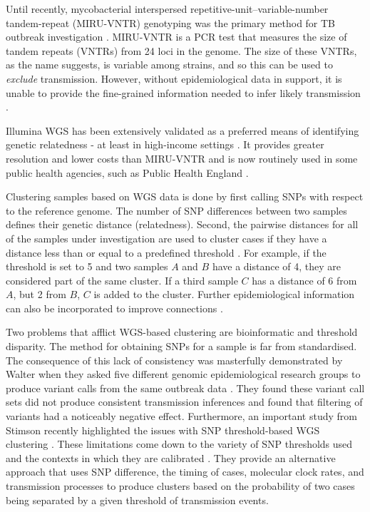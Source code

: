 Until recently, mycobacterial interspersed repetitive-unit–variable-number tandem-repeat (MIRU-VNTR) genotyping was the primary method for TB outbreak investigation \cite{walker2013}. MIRU-VNTR is a PCR test that measures the size of tandem repeats (VNTRs) from 24 loci in the \mtb{} genome. The size of these VNTRs, as the name suggests, is variable among strains, and so this can be used to \emph{exclude} transmission. However, without epidemiological data in support, it is unable to provide the fine-grained information needed to infer likely transmission \cite{walker2013,Wyllie2018}.

Illumina WGS has been extensively validated as a preferred means of identifying \mtb{} genetic relatedness - at least in high-income settings \cite{Gardy2011,walker2013,Wyllie2018,tbmask2014,Hatherell2016}. It provides greater resolution and lower costs than MIRU-VNTR and is now routinely used in some public health agencies, such as Public Health England \cite{Wyllie2018}. 

Clustering samples based on WGS data is done by first calling SNPs with respect to the \mtb{} reference genome. The number of SNP differences between two samples defines their genetic distance (relatedness). Second, the pairwise distances for all of the samples under investigation are used to cluster cases if they have a distance less than or equal to a predefined threshold \cite{Gardy2011,walker2013}. For example, if the threshold is set to 5 and two samples $A$ and $B$ have a distance of 4, they are considered part of the same cluster. If a third sample $C$ has a distance of 6 from $A$, but 2 from $B$, $C$ is added to the cluster. Further epidemiological information can also be incorporated to improve connections \cite{Gardy2011,stimson2019}.

Two problems that afflict WGS-based clustering are bioinformatic and threshold disparity. The method for obtaining SNPs for a sample is far from standardised. The consequence of this lack of consistency was masterfully demonstrated by Walter \etal{} when they asked five different genomic epidemiological research groups to produce variant calls from the same outbreak data \cite{walter2020}. They found these variant call sets did not produce consistent transmission inferences and found that filtering of variants had a noticeably negative effect. Furthermore, an important study from Stimson \etal{} recently highlighted the issues with SNP threshold-based WGS clustering \cite{stimson2019}. These limitations come down to the variety of SNP thresholds used and the contexts in which they are calibrated \cite{stimson2019}. They provide an alternative approach that uses SNP difference, the timing of cases, molecular clock rates, and transmission processes to produce clusters based on the probability of two cases being separated by a given threshold of transmission events.

